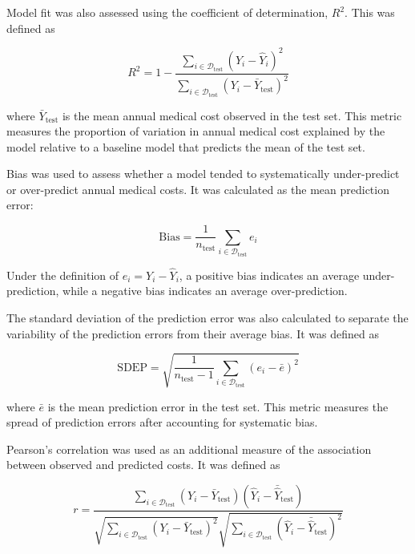 	Model fit was also assessed using the coefficient of determination, \(R^2\). This was defined as
	
	\begin{equation}
		R^2
		=
		1
		-
		\frac{
			\sum_{i \in \mathcal{D}_{\mathrm{test}}}
			(Y_i - \hat{Y}_i)^2
		}{
			\sum_{i \in \mathcal{D}_{\mathrm{test}}}
			(Y_i - \bar{Y}_{\mathrm{test}})^2
		}
	\end{equation}
	
	where \(\bar{Y}_{\mathrm{test}}\) is the mean annual medical cost observed in the test set. This metric measures the proportion of variation in annual medical cost explained by the model relative to a baseline model that predicts the mean of the test set.
	
	Bias was used to assess whether a model tended to systematically under-predict or over-predict annual medical costs. It was calculated as the mean prediction error:
	
	\begin{equation}
		\mathrm{Bias}
		=
		\frac{1}{n_{\mathrm{test}}}
		\sum_{i \in \mathcal{D}_{\mathrm{test}}}
		e_i
	\end{equation}
	
	Under the definition of \(e_i = Y_i - \hat{Y}_i\), a positive bias indicates an average under-prediction, while a negative bias indicates an average over-prediction.
	
	The standard deviation of the prediction error was also calculated to separate the variability of the prediction errors from their average bias. It was defined as
	
	\begin{equation}
		\mathrm{SDEP}
		=
		\sqrt{
			\frac{1}{n_{\mathrm{test}} - 1}
			\sum_{i \in \mathcal{D}_{\mathrm{test}}}
			(e_i - \bar{e})^2
		}
	\end{equation}
	
	where \(\bar{e}\) is the mean prediction error in the test set. This metric measures the spread of prediction errors after accounting for systematic bias.
	
	Pearson's correlation was used as an additional measure of the association between observed and predicted costs. It was defined as
	
	\begin{equation}
		r
		=
		\frac{
			\sum_{i \in \mathcal{D}_{\mathrm{test}}}
			(Y_i - \bar{Y}_{\mathrm{test}})
			(\hat{Y}_i - \bar{\hat{Y}}_{\mathrm{test}})
		}{
			\sqrt{
				\sum_{i \in \mathcal{D}_{\mathrm{test}}}
				(Y_i - \bar{Y}_{\mathrm{test}})^2
			}
			\sqrt{
				\sum_{i \in \mathcal{D}_{\mathrm{test}}}
				(\hat{Y}_i - \bar{\hat{Y}}_{\mathrm{test}})^2
			}
		}
	\end{equation}
	
